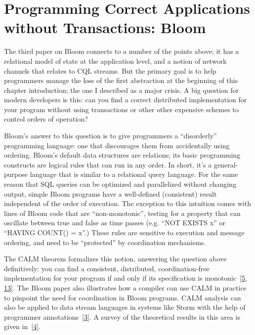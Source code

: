 \documentclass[b5paper,11pt,twoside,openright]{book}
\newcommand\Section[2]{
  \hypertarget{#1}{
    \section{#2}
  }
}
\begin{document}
\Section{programming-correct-applications-without-transactions-bloom}{%
Programming Correct Applications without Transactions: Bloom
}

The third paper on Bloom connects to a number of the points above; it
has a relational model of state at the application level, and a notion
of network channels that relates to CQL streams. But the primary goal is
to help programmers manage the loss of the first abstraction at the
beginning of this chapter introduction; the one I described as a major
crisis. A big question for modern developers is this: can you find a
correct distributed implementation for your program without using
transactions or other other expensive schemes to control orders of
operation?

Bloom's answer to this question is to give programmers a ``disorderly''
programming language: one that discourages them from accidentally using
ordering. Bloom's default data structures are relations; its basic
programming constructs are logical rules that can run in any order. In
short, it's a general-purpose language that is similar to a relational
query language. For the same reason that SQL queries can be optimized
and parallelized without changing output, simple Bloom programs have a
well-defined (consistent) result independent of the order of execution.
The exception to this intuition comes with lines of Bloom code that are
``non-monotonic'', testing for a property that can oscillate between
true and false as time passes (e.g. ``NOT EXISTS x'' or ``HAVING COUNT()
= x''.) These rules are sensitive to execution and message ordering, and
need to be ``protected'' by coordination mechanisms.

The CALM theorem formalizes this notion, answering the question above
definitively: you can find a consistent, distributed, coordination-free
implementation for your program if and only if its specification is
monotonic~{{[}\protect\hyperlink{ref-ameloot2013relational}{5},
  \protect\hyperlink{ref-hellerstein2010declarative}{13}{]}}. The Bloom
paper also illustrates how a compiler can use CALM in practice to
pinpoint the need for coordination in Bloom programs. CALM analysis can
also be applied to data stream languages in systems like Storm with the
help of programmer
annotations~{{[}\protect\hyperlink{ref-alvaro2014blazes}{3}{]}}. A
survey of the theoretical results in this area is given
in~{{[}\protect\hyperlink{ref-ameloot2014declarative}{4}{]}}.
\end{document}
